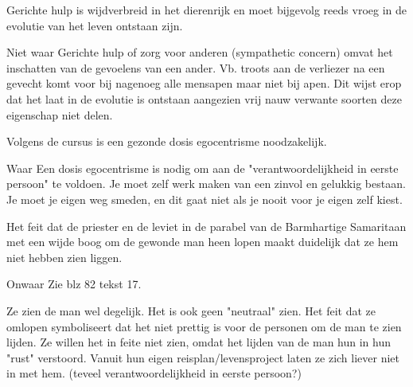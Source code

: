 \documentclass[main.tex]{subfiles}
\begin{document}
\begin{examenvraag}
    \begin{stelling}
        Gerichte hulp is wijdverbreid in het dierenrijk en moet bijgevolg reeds vroeg in de evolutie van het leven ontstaan zijn.
    \end{stelling}

    \begin{stelling-antwoord}{Niet waar}
	Gerichte hulp of zorg voor anderen‭ (‬sympathetic concern‭) ‬omvat het inschatten van de gevoelens 
	van een ander.‭ ‬Vb.‭ ‬troots aan de verliezer na een gevecht komt voor bij nagenoeg alle mensapen 
	maar niet bij apen.‭ ‬Dit wijst erop dat het laat in de evolutie is ontstaan aangezien vrij nauw 
	verwante soorten deze eigenschap niet delen.
    \end{stelling-antwoord}
\end{examenvraag}


\begin{examenvraag}
    \begin{stelling}
        Volgens de cursus is een gezonde dosis egocentrisme noodzakelijk.
    \end{stelling}

	 \begin{stelling-antwoord}{Waar}
        Een dosis egocentrisme is nodig om aan de "verantwoordelijkheid in eerste persoon" te voldoen. 
        Je moet zelf werk maken van een zinvol en gelukkig bestaan. 
        Je moet je eigen weg smeden, en dit gaat niet als je nooit voor je eigen zelf kiest.
    \end{stelling-antwoord}
\end{examenvraag}


\begin{examenvraag}
    \begin{stelling}
        Het feit dat de priester en de leviet in de parabel van de Barmhartige Samaritaan met een wijde boog om de gewonde man heen lopen maakt duidelijk dat ze hem niet hebben zien liggen.
    \end{stelling}

	 \begin{stelling-antwoord}{Onwaar}
	   Zie blz 82 tekst 17.
	   
	   Ze zien de man wel degelijk. 
	   Het is ook geen "neutraal" zien.
	   Het feit dat ze omlopen symboliseert dat het niet prettig is voor de personen om de man te zien lijden.
	   Ze willen het in feite niet zien, omdat het lijden van de man hun in hun "rust" verstoord. 
	   Vanuit hun eigen reisplan/levensproject laten ze zich liever niet in met hem. 
	   (teveel verantwoordelijkheid in eerste persoon?)
	 
    \end{stelling-antwoord}
\end{examenvraag}
\end{document}
